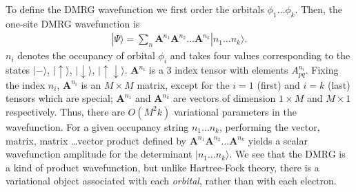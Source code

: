 \documentclass[letterpaper,12pt,aps, pra]{revtex4-1}
\begin{document}

To define the DMRG wavefunction we first order the orbitals 
$\phi_1 \ldots \phi_k$. Then, the one-site DMRG wavefunction is
\begin{align}
|\Psi\rangle = \sum_{n} \mathbf{A}^{n_1} \mathbf{A}^{n_2} \ldots \mathbf{A}^{n_k} |n_1 \ldots n_k\rangle \label{eq:one_site}.
\end{align}
$n_i$ denotes the occupancy of orbital $\phi_i$ and takes four values corresponding to
 the states $|-\rangle$, $|\uparrow\rangle$, $|\downarrow\rangle$, $|\uparrow\downarrow\rangle$.
$\mathbf{A}^{n_i}$ is a 3 index tensor with elements $A^{n_i}_{pq}$. Fixing the index $n_i$, $\mathbf{A}^{n_i}$  
is  an $M \times M$ matrix, except for the $i=1$ (first) and $i=k$ (last) tensors which are special;
 $\mathbf{A}^{n_1}$ and $\mathbf{A}^{n_k}$ are vectors of dimension $1\times M$ and $M\times 1$ respectively.
Thus, there are  $O(M^2k)$  variational parameters in the wavefunction.
For a  given occupancy string $n_1 \ldots n_k$, performing the vector, matrix, matrix \ldots vector product
defined by $\mathbf{A}^{n_1} \mathbf{A}^{n_2} \ldots \mathbf{A}^{n_k}$ yields
a scalar wavefunction amplitude for the determinant $|n_1 \ldots n_k\rangle$. We see that the DMRG
is a kind of product wavefunction, but unlike Hartree-Fock theory, there is a variational object
associated with each {\it orbital}, rather than with each electron.
\end{document}
